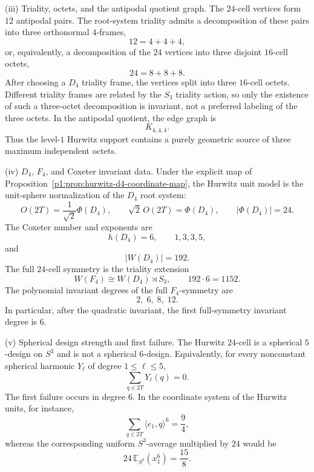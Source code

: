 \documentclass[11pt]{article}
\begin{document}
\begin{theorem}
\smallskip
\noindent\textup{(iii) Triality, octets, and the antipodal quotient graph.}
The \(24\)-cell vertices form \(12\) antipodal pairs.  The root-system triality
admits a decomposition of these pairs into three orthonormal \(4\)-frames,
\[
    12=4+4+4,
\]
or, equivalently, a decomposition of the \(24\) vertices into three disjoint
\(16\)-cell octets,
\[
    24=8+8+8.
\]
After choosing a \(D_4\) triality frame, the vertices split into three \(16\)-cell octets.  Different triality frames are related by the \(S_3\) triality action, so only the existence of such a three-octet decomposition is invariant, not a preferred labeling of the three octets.  In the
antipodal quotient, the edge graph is
\[
    K_{4,4,4}.
\]
Thus the level-\(1\) Hurwitz support contains a purely geometric source of three
maximum independent octets.

\smallskip
\noindent\textup{(iv) \(D_4\), \(F_4\), and Coxeter invariant data.}
Under the explicit map of
Proposition~\ref{p1:prop:hurwitz-d4-coordinate-map}, the Hurwitz unit model is
the unit-sphere normalization of the \(D_4\) root system:
\[
    O(2T)=\frac1{\sqrt2}\Phi(D_4),
    \qquad
    \sqrt2\,O(2T)=\Phi(D_4),
    \qquad
    |\Phi(D_4)|=24.
\]
The Coxeter number and exponents are
\[
    h(D_4)=6,
    \qquad
    1,3,3,5,
\]
and
\[
    |W(D_4)|=192.
\]
The full \(24\)-cell symmetry is the triality extension
\[
    W(F_4)\cong W(D_4)\rtimes S_3,
    \qquad
    192\cdot 6=1152.
\]
The polynomial invariant degrees of the full \(F_4\)-symmetry are
\[
    2,\;6,\;8,\;12.
\]
In particular, after the quadratic invariant, the first full-symmetry invariant
degree is \(6\).

\smallskip
\noindent\textup{(v) Spherical design strength and first failure.}
The Hurwitz \(24\)-cell is a spherical \(5\)-design on \(S^3\) and is not a
spherical \(6\)-design.  Equivalently, for every nonconstant spherical harmonic
\(Y_\ell\) of degree \(1\le \ell\le5\),
\[
    \sum_{q\in2T}Y_\ell(q)=0.
\]
The first failure occurs in degree \(6\).  In the coordinate system of the
Hurwitz units, for instance,
\[
    \sum_{q\in2T}\langle e_1,q\rangle^6=\frac94,
\]
whereas the corresponding uniform \(S^3\)-average multiplied by \(24\) would be
\[
    24\,\mathbb E_{S^3}(x_1^6)=\frac{15}{8}.
\]


\end{theorem}
\end{document}
